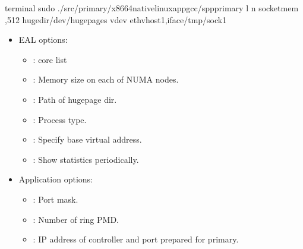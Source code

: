 \documentclass[a4paper,11pt,openany,oneside,english]{sphinxmanual}
\begin{document}
\begin{sphinxVerbatim}[commandchars=\\\{\},formatcom=\footnotesize]
 terminal 
 sudo ./src/primary/x86\PYGZus{}64\PYGZhy{}native\PYGZhy{}linuxapp\PYGZhy{}gcc/spp\PYGZus{}primary 
    \PYGZhy{}l  \PYGZhy{}n  
    \PYGZhy{}\PYGZhy{}socket\PYGZhy{}mem ,512 
    \PYGZhy{}\PYGZhy{}huge\PYGZhy{}dir/dev/hugepages 
    \PYGZhy{}\PYGZhy{}vdev eth\PYGZus{}vhost1,iface/tmp/sock1  
\end{sphinxVerbatim}
\begin{itemize}
\item {} 
EAL options:
\begin{itemize}
\item {} 
: core list

\item {} 
: Memory size on each of NUMA nodes.

\item {} 
: Path of hugepage dir.

\item {} 
: Process type.

\item {} 
: Specify base virtual address.

\item {} 
: Show statistics periodically.

\end{itemize}

\item {} 
Application options:
\begin{itemize}
\item {} 
: Port mask.

\item {} 
: Number of ring PMD.

\item {} 
: IP address of controller and port prepared for primary.

\end{itemize}

\end{itemize}
\end{document}
